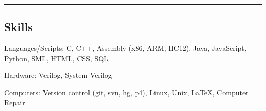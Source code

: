 \documentclass[10pt, letterpaper]{article}
\newcommand{\titleTopOffset}{-1.0em} %
\newcommand{\titleBotOffset}{-0.4em} %
\newenvironment{indentsection}[1]%
{\begin{list}{}
    {\setlength{\leftmargin}{#1}}
    \item[]
}
{\end{list}}
\newcommand{\sectionheader}[1]
{\hrule
\vspace{\titleTopOffset}
\subsection*{#1}
\vspace{\titleBotOffset}}
\begin{document}
\sectionheader{Skills}
\begin{indentsection}{\parindent}
    \begin{description*}
        \item[Languages/Scripts:]
            C, C++, Assembly (x86, ARM, HC12), Java, JavaScript, Python, SML,
            HTML, CSS, SQL

        \item[Hardware:]
            Verilog, System Verilog

        \item[Computers:]
            Version control (git, svn, hg, p4), Linux, Unix, \LaTeX,
            Computer Repair

    \end{description*}
\end{indentsection}
\end{document}
